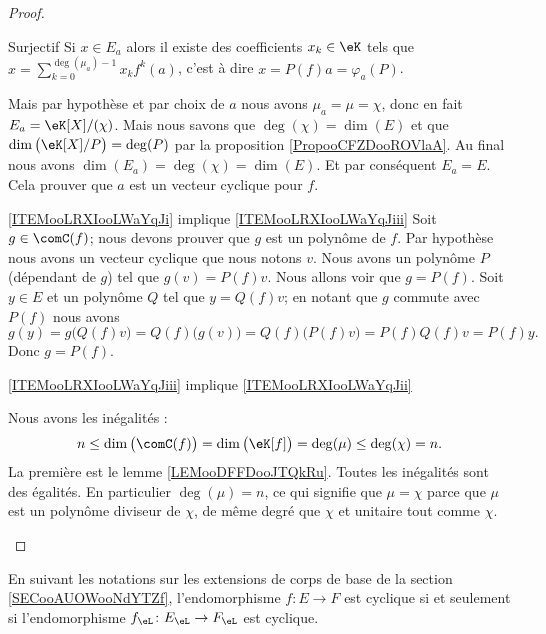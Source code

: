 \begin{proof}
\begin{subproof}
\begin{subproof}
                \item[Surjectif]
                    Si \( x\in E_a\) alors il existe des coefficients \( x_k\in \eK\) tels que \( x=\sum_{k=0}^{\deg(\mu_a)-1}x_kf^k(a)\), c'est à dire \( x=P(f)a=\varphi_a(P)\).
            \end{subproof}
            Mais par hypothèse et par choix de \( a\) nous avons \( \mu_a=\mu=\chi\), donc en fait \( E_a=\eK[X]/(\chi)\). Mais nous savons que \( \deg(\chi)=\dim(E)\) et que \( \dim\big( \eK[X]/P \big)=\deg(P)\) par la proposition \ref{PropooCFZDooROVlaA}. Au final nous avons \( \dim(E_a)=\deg(\chi)=\dim(E)\). Et par conséquent \( E_a=E\). Cela prouver que \( a\) est un vecteur cyclique pour \( f\).

        \item[\ref{ITEMooLRXIooLWaYqJi} implique \ref{ITEMooLRXIooLWaYqJiii}]
            Soit \( g\in \comC(f)\); nous devons prouver que \( g\) est un polynôme de \( f\). Par hypothèse nous avons un vecteur cyclique que nous notons \( v\). Nous avons un polynôme \( P\) (dépendant de \( g\)) tel que \( g(v)=P(f)v\). Nous allons voir que \( g=P(f)\). Soit \( y\in E\) et un polynôme \( Q\) tel que \( y=Q(f)v\); en notant que \( g\) commute avec \( P(f)\) nous avons 
            \begin{equation}
                g(y)=g\big( Q(f)v \big)=Q(f)\big( g(v) \big)=Q(f)\big( P(f)v \big)=P(f)Q(f)v=P(f)y.
            \end{equation}
            Donc \( g=P(f)\).

        \item[\ref{ITEMooLRXIooLWaYqJiii} implique \ref{ITEMooLRXIooLWaYqJii}]

            Nous avons les inégalités :
            \begin{equation}
                n\leq \dim\big( \comC(f) \big)=\dim\big( \eK[f] \big)=\deg(\mu)\leq \deg(\chi)=n.
            \end{equation}
            La première est le lemme \ref{LEMooDFFDooJTQkRu}. Toutes les inégalités sont des égalités. En particulier \( \deg(\mu)=n\), ce qui signifie que \( \mu=\chi\) parce que \( \mu\) est un polynôme diviseur de \( \chi\), de même degré que \( \chi\) et unitaire tout comme \( \chi\).

    \end{subproof}
\end{proof}

\begin{corollary}        \label{CORooAKQEooSliXPp}
    En suivant les notations sur les extensions de corps de base de la section \ref{SECooAUOWooNdYTZf}, l'endomorphisme \( f\colon E\to F\) est cyclique si et seulement si l'endomorphisme \( f_{\eL}\colon E_{\eL}\to F_{\eL}\) est cyclique.
\end{corollary}

